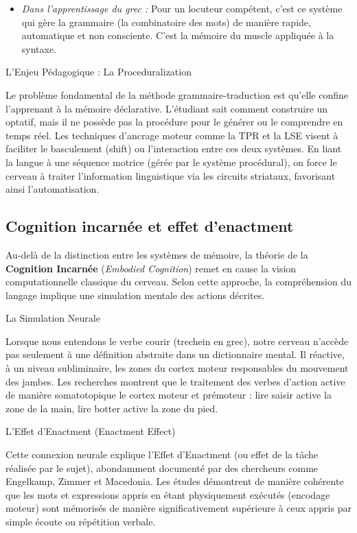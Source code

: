 \begin{itemize}\item \textit{Dans l'apprentissage du grec :} Pour un locuteur compétent, c'est ce système qui gère la grammaire (la combinatoire des mots) de manière rapide, automatique et non consciente. C'est la \og mémoire du muscle\fg{} appliquée à la syntaxe.\cite{III-2-2-ref3}\end{itemize}L'Enjeu Pédagogique : La \og Proceduralization\fg{}

Le problème fondamental de la méthode grammaire-traduction est qu'elle confine l'apprenant à la
mémoire déclarative. L'étudiant sait comment construire un optatif, mais il ne possède pas la
procédure pour le générer ou le comprendre en temps réel. Les techniques d'ancrage moteur comme la
TPR et la LSE visent à faciliter le basculement (shift) ou l'interaction entre ces deux systèmes. En
liant la langue à une séquence motrice (gérée par le système procédural), on force le cerveau à
traiter l'information linguistique via les circuits striataux, favorisant ainsi
l'automatisation.\cite{III-2-2-ref6}



\subsection{Cognition incarnée et effet d'enactment}

Au-delà de la distinction entre les systèmes de mémoire, la théorie de la \textbf{Cognition
Incarnée} (\textit{Embodied Cognition}) remet en cause la vision computationnelle classique du
cerveau. Selon cette approche, la compréhension du langage implique une simulation mentale des
actions décrites.

La Simulation Neurale

Lorsque nous entendons le verbe \og courir\fg{} (trechein en grec), notre cerveau n'accède pas
seulement à une définition abstraite dans un dictionnaire mental. Il réactive, à un niveau
subliminaire, les zones du cortex moteur responsables du mouvement des jambes.\cite{III-2-2-ref10}
Les recherches montrent que le traitement des verbes d'action active de manière somatotopique le
cortex moteur et prémoteur : lire \og saisir\fg{} active la zone de la main, lire \og botter\fg{}
active la zone du pied.\cite{III-2-2-ref13}

L'Effet d'Enactment (Enactment Effect)

Cette connexion neurale explique l'Effet d'Enactment (ou effet de la tâche réalisée par le sujet),
abondamment documenté par des chercheurs comme Engelkamp, Zimmer et Macedonia.\cite{III-2-2-ref9}
Les études démontrent de manière cohérente que les mots et expressions appris en étant physiquement
exécutés (encodage moteur) sont mémorisés de manière significativement supérieure à ceux appris par
simple écoute ou répétition verbale.

